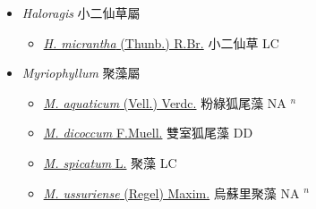 
  \begin{itemize}
 \item[] \textit{Haloragis} 小二仙草屬
                    
  \begin{itemize}
        \item[] \href{http://www.theplantlist.org/tpl1.1/search?q=Haloragis+micrantha}{\textit{H. micrantha} (Thunb.) R.Br.}   小二仙草 LC
  \end{itemize}
 \item[] \textit{Myriophyllum} 聚藻屬
                    
  \begin{itemize}
        \item[] \href{http://www.theplantlist.org/tpl1.1/search?q=Myriophyllum+aquaticum}{\textit{M. aquaticum} (Vell.) Verdc.}   粉綠狐尾藻 NA $^n$
        \item[] \href{http://www.theplantlist.org/tpl1.1/search?q=Myriophyllum+dicoccum}{\textit{M. dicoccum} F.Muell.}   雙室狐尾藻 DD
        \item[] \href{http://www.theplantlist.org/tpl1.1/search?q=Myriophyllum+spicatum}{\textit{M. spicatum} L.}   聚藻 LC
        \item[] \href{http://www.theplantlist.org/tpl1.1/search?q=Myriophyllum+ussuriense}{\textit{M. ussuriense} (Regel) Maxim.}   烏蘇里聚藻 NA $^n$
  \end{itemize}
  \end{itemize}

